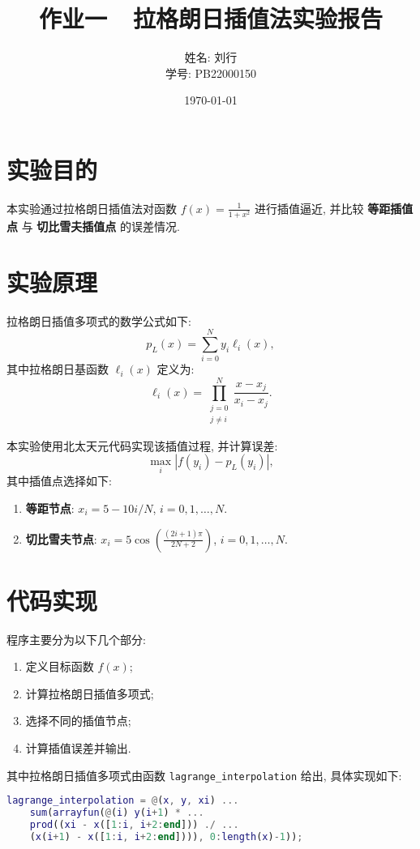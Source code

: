 \documentclass[12pt]{article}
\title{作业一~~拉格朗日插值法实验报告}
\author{姓名: 刘行 \\ 学号: PB22000150}
\date{\today}
\begin{document}
	\maketitle
	\section{实验目的}
		本实验通过拉格朗日插值法对函数 $f(x) = \frac{1}{1+x^2}$ 进行插值逼近, 并比较 \textbf{等距插值点} 与 \textbf{切比雪夫插值点} 的误差情况.

	\section{实验原理}
		拉格朗日插值多项式的数学公式如下:
		\begin{equation}
			p_L(x) = \sum_{i=0}^{N} y_i \ell_i(x),
		\end{equation}
		其中拉格朗日基函数 $\ell_i(x)$ 定义为:
		\begin{equation}
			\ell_i(x) = \prod_{\substack{j=0 \\ j \neq i}}^{N} \frac{x - x_j}{x_i - x_j}.
		\end{equation}

		本实验使用北太天元代码实现该插值过程, 并计算误差:
		\begin{equation}
			\max_{i} |f(y_i) - p_L(y_i)|,
		\end{equation}
		其中插值点选择如下:
		\begin{enumerate}
			\item \textbf{等距节点}: $x_i = 5 - 10i/N$, $i = 0,1,\dots,N$.
			\item \textbf{切比雪夫节点}: $x_i = 5 \cos \left( \frac{(2i+1)\pi}{2N+2} \right)$, $i = 0,1,\dots,N$.
		\end{enumerate}

	\section{代码实现}
		程序主要分为以下几个部分:
		\begin{enumerate}
			\item 定义目标函数 $f(x)$;
			\item 计算拉格朗日插值多项式;
			\item 选择不同的插值节点;
			\item 计算插值误差并输出.
		\end{enumerate}

		其中拉格朗日插值多项式由函数 \texttt{lagrange\_interpolation} 给出, 具体实现如下:
		\begin{lstlisting}[language=Matlab]
lagrange_interpolation = @(x, y, xi) ...
	sum(arrayfun(@(i) y(i+1) * ...
	prod((xi - x([1:i, i+2:end])) ./ ...
	(x(i+1) - x([1:i, i+2:end]))), 0:length(x)-1));
		\end{lstlisting}
\end{document}
